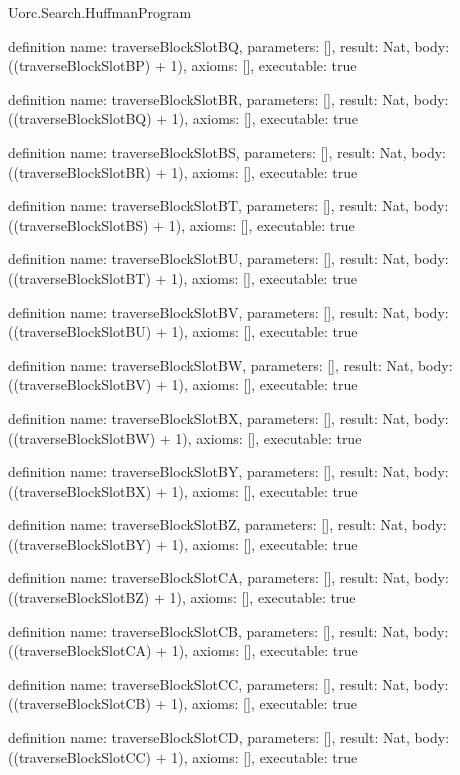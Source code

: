 \begin{lexlean}{Uorc.Search.HuffmanProgram}
\begin{semanticmodule}
definition{
  name: traverseBlockSlotBQ,
  parameters: [],
  result: Nat,
  body: ((traverseBlockSlotBP) + 1),
  axioms: [],
  executable: true
}

definition{
  name: traverseBlockSlotBR,
  parameters: [],
  result: Nat,
  body: ((traverseBlockSlotBQ) + 1),
  axioms: [],
  executable: true
}

definition{
  name: traverseBlockSlotBS,
  parameters: [],
  result: Nat,
  body: ((traverseBlockSlotBR) + 1),
  axioms: [],
  executable: true
}

definition{
  name: traverseBlockSlotBT,
  parameters: [],
  result: Nat,
  body: ((traverseBlockSlotBS) + 1),
  axioms: [],
  executable: true
}

definition{
  name: traverseBlockSlotBU,
  parameters: [],
  result: Nat,
  body: ((traverseBlockSlotBT) + 1),
  axioms: [],
  executable: true
}

definition{
  name: traverseBlockSlotBV,
  parameters: [],
  result: Nat,
  body: ((traverseBlockSlotBU) + 1),
  axioms: [],
  executable: true
}

definition{
  name: traverseBlockSlotBW,
  parameters: [],
  result: Nat,
  body: ((traverseBlockSlotBV) + 1),
  axioms: [],
  executable: true
}

definition{
  name: traverseBlockSlotBX,
  parameters: [],
  result: Nat,
  body: ((traverseBlockSlotBW) + 1),
  axioms: [],
  executable: true
}

definition{
  name: traverseBlockSlotBY,
  parameters: [],
  result: Nat,
  body: ((traverseBlockSlotBX) + 1),
  axioms: [],
  executable: true
}

definition{
  name: traverseBlockSlotBZ,
  parameters: [],
  result: Nat,
  body: ((traverseBlockSlotBY) + 1),
  axioms: [],
  executable: true
}

definition{
  name: traverseBlockSlotCA,
  parameters: [],
  result: Nat,
  body: ((traverseBlockSlotBZ) + 1),
  axioms: [],
  executable: true
}

definition{
  name: traverseBlockSlotCB,
  parameters: [],
  result: Nat,
  body: ((traverseBlockSlotCA) + 1),
  axioms: [],
  executable: true
}

definition{
  name: traverseBlockSlotCC,
  parameters: [],
  result: Nat,
  body: ((traverseBlockSlotCB) + 1),
  axioms: [],
  executable: true
}

definition{
  name: traverseBlockSlotCD,
  parameters: [],
  result: Nat,
  body: ((traverseBlockSlotCC) + 1),
  axioms: [],
  executable: true
}


\end{semanticmodule}
\end{lexlean}
